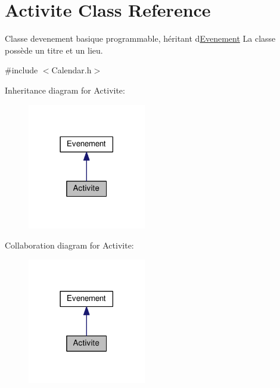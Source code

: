\hypertarget{class_activite}{}\section{Activite Class Reference}
\label{class_activite}


Classe d\textquotesingle{}evenement basique programmable, héritant d\textquotesingle{}\hyperlink{class_evenement}{Evenement} La classe possède un titre et un lieu.  




{\ttfamily \#include $<$Calendar.\+h$>$}



Inheritance diagram for Activite\+:\nopagebreak
\begin{figure}[H]
\begin{center}
\leavevmode
\includegraphics[width=146pt]{class_activite__inherit__graph}
\end{center}
\end{figure}


Collaboration diagram for Activite\+:\nopagebreak
\begin{figure}[H]
\begin{center}
\leavevmode
\includegraphics[width=146pt]{class_activite__coll__graph}
\end{center}
\end{figure}
